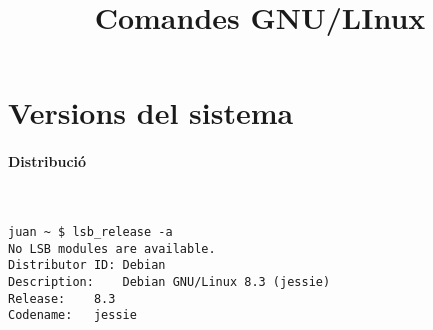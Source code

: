 \documentclass[a4paper,twocolumn]{report}
\begin{document}
\title{Comandes GNU/LInux}
\maketitle

\section{Versions del sistema}

\paragraph{Distribució}\\
\begin{verbatim}
juan ~ $ lsb_release -a
No LSB modules are available.
Distributor ID:	Debian
Description:	Debian GNU/Linux 8.3 (jessie)
Release:	8.3
Codename:	jessie
\end{verbatim}
\end{document}
